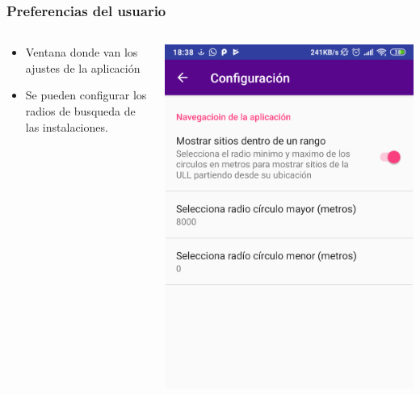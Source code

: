 \begin{frame}
	\frametitle{Preferencias del usuario}
	\begin{columns}
		\begin{column}{0.6\textwidth}
			\begin{itemize}
				\item Ventana donde van los ajustes de la aplicación
				\item Se pueden configurar los radios de busqueda de las instalaciones.
			\end{itemize}
			\endblock{}
		\end{column}
		\begin{column}{0.4\textwidth} 
			\vfill 
			\begin{center}
				\includegraphics[width=0.9\linewidth]{Images/settingsApp}
			\end{center}
		\end{column}
	\end{columns}
\end{frame} 

% 	
